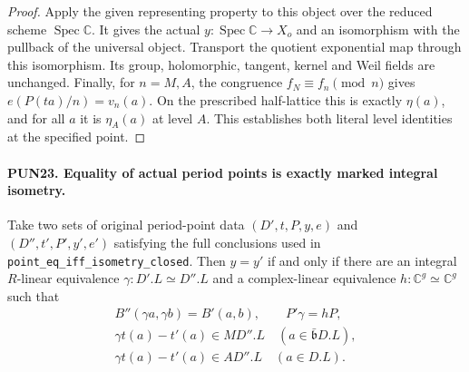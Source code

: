 \documentclass[11pt,a4paper]{article}
\numberwithin{equation}{section}
\theoremstyle{remark}\newtheorem{remark}[theorem]{Remark}
\begin{document}
\begin{proof}
Apply the given representing property to this object over
the reduced scheme \(\operatorname{Spec}\mathbb C\).
It gives the actual \(y:\operatorname{Spec}\mathbb C\to X_o\)
and an isomorphism with the pullback of the universal object.
Transport the quotient exponential map through this
isomorphism.  Its group, holomorphic, tangent, kernel and
Weil fields are unchanged.  Finally, for \(n=M,A\), the
congruence \(f_N\equiv f_n\pmod n\) gives
\(e(P(t a)/n)=v_n(a)\).  On the prescribed half-lattice
this is exactly \(\eta(a)\), and for all \(a\) it is
\(\eta_A(a)\) at level \(A\).  This establishes both
literal level identities at the specified point.
\end{proof}

\paragraph{PUN23. Equality of actual period points is exactly marked integral isometry.}
\label{claim:PUN23}
Take two sets of original period-point data
\((D',t,P,y,e)\) and \((D'',t',P',y',e')\) satisfying the
full conclusions used in \texttt{point\_\allowbreak eq\_\allowbreak iff\_\allowbreak isometry\_\allowbreak closed}.
Then \(y=y'\) if and only if there are an integral
\(R\)-linear equivalence \(\gamma:D'.L\simeq D''.L\)
and a complex-linear equivalence \(h:\mathbb C^g\simeq\mathbb C^g\)
such that
\[
 \begin{gathered}
 B''(\gamma a,\gamma b)=B'(a,b),\qquad P'\gamma=hP,\\
 \gamma t(a)-t'(a)\in MD''.L\quad(a\in\bar{\mathfrak b}D.L),\\
 \gamma t(a)-t'(a)\in AD''.L\quad(a\in D.L).
 \end{gathered}                                                   \tag{PUN.41}
\]
\end{document}
